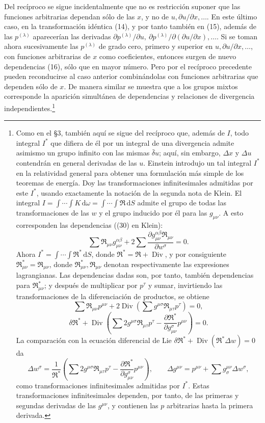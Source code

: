 \documentclass[11pt]{article}
\newcommand{\D}{\Delta}
\providecommand{\dd}{\mathrm d}
\providecommand{\Div}{\operatorname{Div}}
\providecommand{\bd}{\bar{\delta}}
\providecommand{\p}{\partial}
\begin{document}
Del recíproco se sigue incidentalmente que no es restricción suponer que las funciones arbitrarias dependan sólo de las \(x\), y no de \(u,\p u/\p x,\ldots\). En este último caso, en la transformación idéntica (14), y por tanto también en (15), además de las \(p^{(\lambda)}\) aparecerían las derivadas \(\p p^{(\lambda)}/\p u,\ \p p^{(\lambda)}/\p(\p u/\p x),\ldots\). Si se toman ahora sucesivamente las \(p^{(\lambda)}\) de grado cero, primero y superior en \(u,\p u/\p x,\ldots\), con funciones arbitrarias de \(x\) como coeficientes, entonces surgen de nuevo dependencias (16), sólo que en mayor número. Pero por el recíproco precedente pueden reconducirse al caso anterior combinándolas con funciones arbitrarias que dependen sólo de \(x\). De manera similar se muestra que a los grupos mixtos corresponde la aparición simultánea de dependencias y relaciones de divergencia independientes.\footnote{Como en el \S{}3, también aquí se sigue del recíproco que, además de \(I\), todo integral \(I^*\) que difiera de él por un integral de una divergencia admite asimismo un grupo infinito con las mismas \(\bd u\); aquí, sin embargo, \(\D x\) y \(\D u\) contendrán en general derivadas de las \(u\). Einstein introdujo un tal integral \(I^*\) en la relatividad general para obtener una formulación más simple de los teoremas de energía. Doy las transformaciones infinitesimales admitidas por este \(I^*\), usando exactamente la notación de la segunda nota de Klein. El integral \(I=\int\!\cdots\!\int K\,\dd\omega=\int\!\cdots\!\int \mathfrak{R}\,\dd S\) admite el grupo de todas las transformaciones de las \(w\) y el grupo inducido por él para las \(g_{\mu\nu}\). A esto corresponden las dependencias ((30) en Klein):
\[
\sum \mathfrak{R}_{\mu\nu}g_{\mu\nu}^{\alpha\beta}
+2\sum\frac{\p g_{\mu\nu}^{\alpha\beta}\mathfrak{R}_{\mu\nu}}{\p w^\sigma}=0.
\]
Ahora \(I^*=\int\!\cdots\!\int \mathfrak{R}^*\,\dd S\), donde \(\mathfrak{R}^*=\mathfrak{R}+\Div\), y por consiguiente \(\mathfrak{R}_{\mu\nu}^*=\mathfrak{R}_{\mu\nu}\), donde \(\mathfrak{R}_{\mu\nu}^*,\mathfrak{R}_{\mu\nu}\) denotan respectivamente las expresiones lagrangianas. Las dependencias dadas son, por tanto, también dependencias para \(\mathfrak{R}_{\mu\nu}^*\); y después de multiplicar por \(p^\tau\) y sumar, invirtiendo las transformaciones de la diferenciación de productos, se obtiene
\[
\sum \mathfrak{R}_{\mu\nu}p^{\mu\nu}
+2\Div\!\left(\sum g^{\mu\sigma}\mathfrak{R}_{\mu\tau}p^\tau\right)=0,
\]
\[
\delta\mathfrak{R}^*+\Div\!\left(\sum 2g^{\mu\sigma}\mathfrak{R}_{\mu\tau}p^\tau
-\frac{\p\mathfrak{R}^*}{\p g_{\mu\nu}^{\sigma}}p^{\mu\nu}\right)=0.
\]
La comparación con la ecuación diferencial de Lie
\(\delta\mathfrak{R}^*+\Div(\mathfrak{R}^*\D w)=0\) da
\[
\D w^\sigma=\frac1{\mathfrak{R}^*}\left(\sum 2g^{\mu\sigma}\mathfrak{R}_{\mu\tau}p^\tau
-\frac{\p\mathfrak{R}^*}{\p g_{\mu\nu}^{\sigma}}p^{\mu\nu}\right),
\qquad
\D g^{\mu\nu}=p^{\mu\nu}+\sum g^{\mu\nu}_{\sigma}\D w^\sigma,
\]
como transformaciones infinitesimales admitidas por \(I^*\). Estas transformaciones infinitesimales dependen, por tanto, de las primeras y segundas derivadas de las \(g^{\mu\nu}\), y contienen las \(p\) arbitrarias hasta la primera derivada.}
\end{document}
